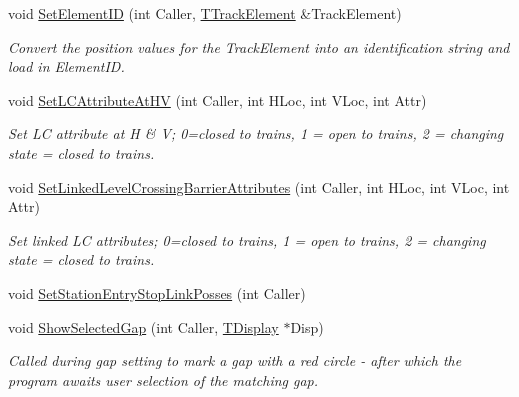 \begin{DoxyCompactItemize}
void \mbox{\hyperlink{class_t_track_a31296f2176bd672769e1852ca90ddd51}{Set\+Element\+ID}} (int Caller, \mbox{\hyperlink{class_t_track_element}{T\+Track\+Element}} \&Track\+Element)
\begin{DoxyCompactList}\small\item\em Convert the position values for the Track\+Element into an identification string and load in Element\+ID. \end{DoxyCompactList}\item 
\mbox{\label{class_t_track_a43c4adf8324c465b90bad0a4dd6761a2}} 
void \mbox{\hyperlink{class_t_track_a43c4adf8324c465b90bad0a4dd6761a2}{Set\+L\+C\+Attribute\+At\+HV}} (int Caller, int H\+Loc, int V\+Loc, int Attr)
\begin{DoxyCompactList}\small\item\em Set LC attribute at H \& V; 0=closed to trains, 1 = open to trains, 2 = changing state = closed to trains. \end{DoxyCompactList}\item 
\mbox{\label{class_t_track_a57723388cbfcaf525bf982d8e095949e}} 
void \mbox{\hyperlink{class_t_track_a57723388cbfcaf525bf982d8e095949e}{Set\+Linked\+Level\+Crossing\+Barrier\+Attributes}} (int Caller, int H\+Loc, int V\+Loc, int Attr)
\begin{DoxyCompactList}\small\item\em Set linked LC attributes; 0=closed to trains, 1 = open to trains, 2 = changing state = closed to trains. \end{DoxyCompactList}\item 
void \mbox{\hyperlink{class_t_track_a46b69ee08436c2ff5e41673df04bcf11}{Set\+Station\+Entry\+Stop\+Link\+Posses}} (int Caller)
\item 
\mbox{\label{class_t_track_a7fe1e2c641e38da6ab3fdbf20e529d2c}} 
void \mbox{\hyperlink{class_t_track_a7fe1e2c641e38da6ab3fdbf20e529d2c}{Show\+Selected\+Gap}} (int Caller, \mbox{\hyperlink{class_t_display}{T\+Display}} $\ast$Disp)
\begin{DoxyCompactList}\small\item\em Called during gap setting to mark a gap with a red circle -\/ after which the program awaits user selection of the matching gap. \end{DoxyCompactList}\item 
\mbox{\label{class_t_track_ae6fe537bbd1e56074a358bf2c6233c71}} 

\end{DoxyCompactItemize}
